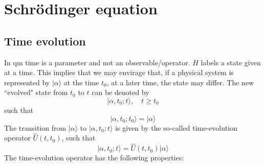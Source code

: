\section{Schrödinger equation}
\subsection{Time evolution}
In qm time is a parameter and not an observable/operator.
$H$ labels a state given at a time. This implies that we may
envirage that, if a physical system is represented by
$\vert \alpha\rangle $ at the time $t_0$, at a later time, the state may
differ. The new ``evolved" state from $t_0$ to $t$ can be
denoted by
$$
\vert \alpha,t_0;t\rangle , \quad t \geq t_0
$$
such that
$$
\vert \alpha,t_0;t_0\rangle  = \vert \alpha\rangle 
$$
The transition from $\vert \alpha\rangle $ to $\vert \alpha,t_0;t\rangle $ is given
by the so-called time-evolution operator $\hat{U}(t,t_0)$,
such that
\begin{equation}
  \vert \alpha,t_0;t\rangle  = \hat{U}(t,t_0) \vert \alpha\rangle 
  \label{equ:2.1}
\end{equation}
The time-evolution operator has the following properties:
